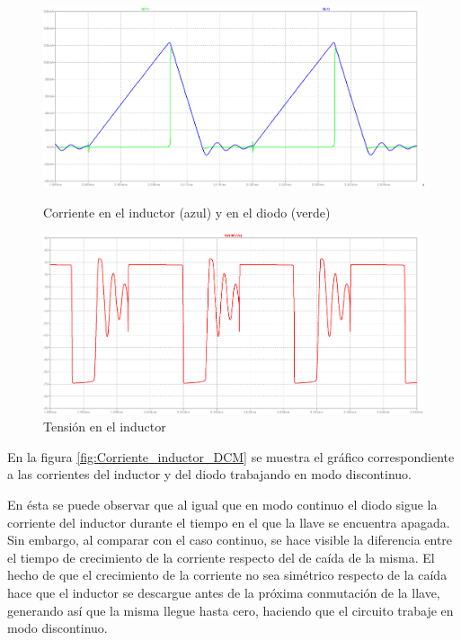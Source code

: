 \documentclass[e4_tp1_main.tex]{subfiles}
\begin{document}
	\begin{figure}[htb]
		\centering
		\begin{minipage}{0.47\textwidth}
			\centering	
			\includegraphics[width=\textwidth]{images/ej4/fig3.png}
			\caption{Corriente en el inductor (azul) y en el diodo (verde)}
			\label{fig:Corriente_inductor_DCM}		
		\end{minipage}
		\hfill
		\begin{minipage}{0.47\textwidth}
			\centering
			\includegraphics[width=\textwidth]{images/ej4/fig4.png}
			\caption{Tensi\'on en el inductor}
			\label{fig:Tension-inductor-DCM}
		\end{minipage}
	\end{figure}
	
	
	En la figura \ref{fig:Corriente_inductor_DCM} se muestra el gráfico correspondiente a las corrientes del inductor y del diodo trabajando en modo discontinuo.
	
	En ésta se puede observar que al igual que en modo continuo el diodo sigue la corriente del inductor durante el tiempo en el que la llave se encuentra apagada. Sin embargo, al comparar con el caso continuo, se hace visible la diferencia entre el tiempo de crecimiento de la corriente respecto del de caída de la misma. El hecho de que el crecimiento de la corriente no sea simétrico respecto de la caída hace que el inductor se descargue antes de la próxima conmutación de la llave, generando así que la misma llegue hasta cero, haciendo que el circuito trabaje en modo discontinuo.
	
\end{document}
